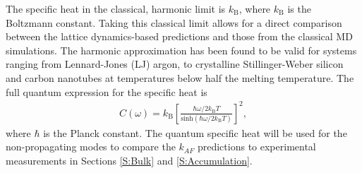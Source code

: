 \documentclass[aps,prb,onecolumn,preprint,superscriptaddress,footinbib,amsmath,amssymb,floatfix]{revtex4}
\begin{document}
The specific heat in the classical, harmonic limit is 
$k_{\text{B}}$, where $k_{\text{B}}$ is the Boltzmann constant.
\cite{mcquarrie_statistical_2000}
Taking this classical limit allows for a direct 
comparison between the lattice dynamics-based 
predictions and those from the classical MD simulations. 
The harmonic approximation has been found to be valid 
for systems ranging from 
Lennard-Jones (LJ) argon,\cite{mcgaughey_quantitative_2004} 
to crystalline Stillinger-Weber silicon 
and carbon nanotubes\cite{larkin_comparison_2012} at temperatures 
below half the melting temperature. 
The full quantum expression for the specific heat is
\cite{ziman_electrons_2001}
\begin{equation}\label{EQ:Cquantum}
\begin{split}
C(\omega) = k_{\text{B}}\left[\frac{\hbar\omega/2k_{\text{B}}T}
{\text{sinh}(\hbar\omega/2k_{\text{B}}T)}\right]^2,
\end{split}
\end{equation} 
where $\hbar$ is the Planck constant.\cite{ashcroft_solid_1976} 
The quantum specific heat will be used for the 
non-propagating modes to compare the $k_{AF}$ predictions 
to experimental measurements in Sections \ref{S:Bulk} 
and \ref{S:Accumulation}. 
\end{document}
